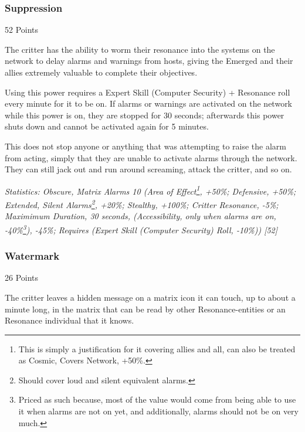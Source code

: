 \begin{multicols*}{3}
	\subsubsection{Suppression}\label{suppression}
	\begin{flushright}
		52 Points
	\end{flushright}

	The critter has the ability to worm their resonance into the systems on the network to delay alarms and warnings from hosts, giving the Emerged and their allies extremely valuable to complete their objectives.
	
	Using this power requires a Expert Skill (Computer Security) + Resonance roll every minute for it to be on. If alarms or warnings are activated on the network while this power is on, they are stopped for 30 seconds; afterwards this power shuts down and cannot be activated again for 5 minutes.
	
	This does not stop anyone or anything that was attempting to raise the alarm from acting, simply that they are unable to activate alarms through the network. They can still jack out and run around screaming, attack the critter, and so on.

	\textcolor{OliveGreen}{\textit{Statistics: Obscure, Matrix Alarms 10 (Area of Effect\footnote{This is simply a justification for it covering allies and all, can also be treated as Cosmic, Covers Network, +50\%.}, +50\%; Defensive, +50\%; Extended, Silent Alarms\footnote{Should cover loud and silent equivalent alarms.}, +20\%; Stealthy, +100\%; Critter Resonance, -5\%; Maximimum Duration, 30 seconds, (Accessibility, only when alarms are on, -40\%\footnote{Priced as such because, most of the value would come from being able to use it when alarms are not on yet, and additionally, alarms should not be on very much.}), -45\%; Requires (Expert Skill (Computer Security) Roll, -10\%)) [52] }}

	\subsubsection{Watermark}\label{watermark}
	\begin{flushright}
		26 Points
	\end{flushright}

	The critter leaves a hidden message on a matrix icon it can touch, up to about a minute long, in the matrix that can be read by other Resonance-entities or an Resonance individual that it knows. 
	

\end{multicols*}
